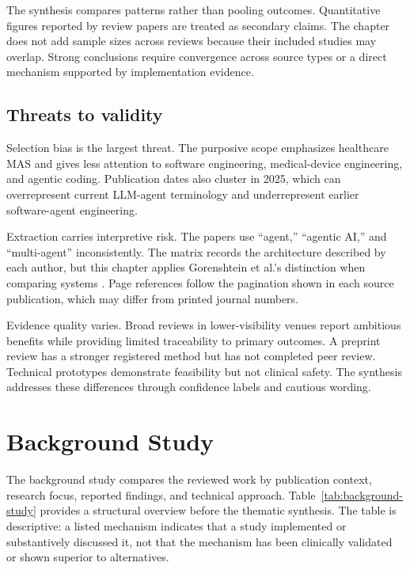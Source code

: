 \documentclass[11pt,a4paper]{article}
\begin{document}
The synthesis compares patterns rather than pooling outcomes. Quantitative figures reported by review papers are treated as secondary claims. The chapter does not add sample sizes across reviews because their included studies may overlap. Strong conclusions require convergence across source types or a direct mechanism supported by implementation evidence.

\subsection{Threats to validity}

Selection bias is the largest threat. The purposive scope emphasizes healthcare MAS and gives less attention to software engineering, medical-device engineering, and agentic coding. Publication dates also cluster in 2025, which can overrepresent current LLM-agent terminology and underrepresent earlier software-agent engineering.

Extraction carries interpretive risk. The papers use ``agent,'' ``agentic AI,'' and ``multi-agent'' inconsistently. The matrix records the architecture described by each author, but this chapter applies Gorenshtein et al.'s distinction when comparing systems \cite[pp.~23--24]{gorenshtein2025clinical}. Page references follow the pagination shown in each source publication, which may differ from printed journal numbers.

Evidence quality varies. Broad reviews in lower-visibility venues report ambitious benefits while providing limited traceability to primary outcomes. A preprint review has a stronger registered method but has not completed peer review. Technical prototypes demonstrate feasibility but not clinical safety. The synthesis addresses these differences through confidence labels and cautious wording.

\section{Background Study}

The background study compares the reviewed work by publication context, research focus, reported findings, and technical approach. Table~\ref{tab:background-study} provides a structural overview before the thematic synthesis. The table is descriptive: a listed mechanism indicates that a study implemented or substantively discussed it, not that the mechanism has been clinically validated or shown superior to alternatives.
\end{document}
